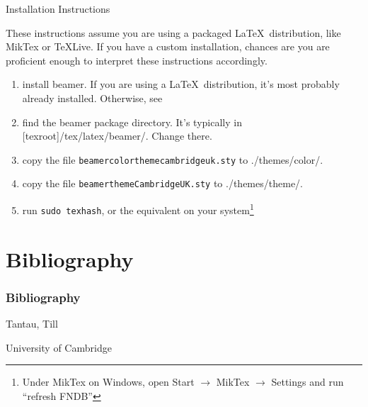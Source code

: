 \documentclass{beamer}
\begin{document}
\begin{frame}{Installation Instructions}

These instructions assume you are using a packaged \LaTeX~distribution, like MikTex or TeXLive. If you have a custom installation, chances are you are proficient enough to interpret these instructions accordingly.

\begin{enumerate}
  \item install beamer. If you are using a \LaTeX~distribution, it's most probably already installed. Otherwise, see \cite{Beamer}
	\item find the beamer package directory. It's typically in [texroot]/tex/latex/beamer/. Change there.
	\item copy the file {\tt beamercolorthemecambridgeuk.sty} to ./themes/color/.
	\item copy the file {\tt beamerthemeCambridgeUK.sty} to ./themes/theme/.
	\item run {\tt sudo texhash}, or the equivalent on your system\footnote{Under MikTex on Windows, open Start $\to$ MikTex $\to$ Settings and run ``refresh FNDB''}
	
\end{enumerate}

\end{frame}

\section*{Bibliography}
\begin{frame}%
\frametitle{Bibliography}

\begin{thebibliography}{Tantau, 2007}
Tantau, Till

University of Cambridge

\end{thebibliography}
\end{frame}
\end{document}
